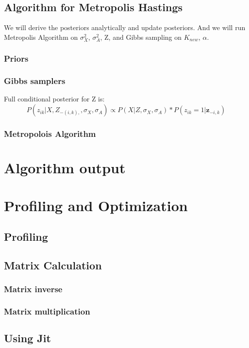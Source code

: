 \documentclass{article}
\begin{document}
\subsection{Algorithm for Metropolis Hastings}
We will derive the posteriors analytically and update posteriors. And we will run Metropolis Algorithm on $\sigma^2_X$, $\sigma^2_A$, Z, and Gibbs sampling on $K_{new}$, $\alpha$.


\subsubsection{Priors}

\subsubsection{Gibbs samplers}

Full conditional posterior for Z is:
$$P(z_{ik}|X,Z_{-(i,k),},\sigma_X,\sigma_A) \propto  P(X|Z,\sigma_X, \sigma_A) * P(z_{ik}=1|\textbf{z}_{-i,k}) $$

\subsubsection{Metropolois Algorithm}


\section{Algorithm output}





\section{Profiling and Optimization}
\subsection{Profiling}
\subsection{Matrix Calculation}
\subsubsection{Matrix inverse}
\subsubsection{Matrix multiplication}
\subsection{Using Jit}
\end{document}
